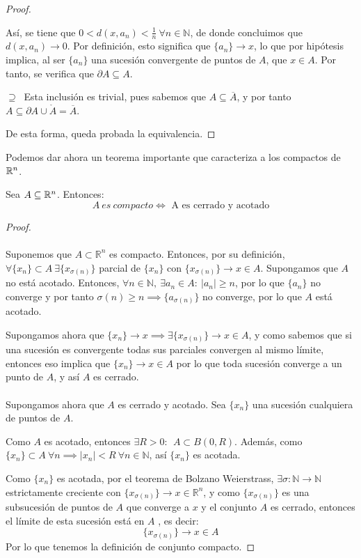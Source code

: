\begin{proof}
\begin{description}
Así, se tiene que $0 < d(x,a_n) < \frac{1}{n}\ \forall n\in \mathbb{N}$, de donde concluimos que $d(x,a_n) \rightarrow 0$. Por definición, esto significa que $\{a_n\} \rightarrow x$, lo que por hipótesis implica, al ser $\{a_n\}$ una sucesión convergente de puntos de $A$, que  $x\in A$. Por tanto, se verifica que $\partial A \subseteq A$.

\item $\displaystyle \boxed{\supseteq}\ $ Esta inclusión es trivial, pues sabemos que $A \subseteq \overline{A}$, y por tanto $A \subseteq \partial A \cup \mathring{A} = \overline{A}$.
\end{description}

De esta forma, queda probada la equivalencia.
\end{proof}

Podemos dar ahora un teorema importante que caracteriza a los compactos de $\mathbb{R}^n$.

\begin{nth}
Sea $A\subseteq \mathbb{R}^n$. Entonces:
\[
A \ es \ compacto \iff \text{ A es cerrado y acotado}
\]
\end{nth}
\begin{proof}\hfill\\
	\boxed{\Rightarrow}\\
	Suponemos que $A \subset \mathbb{R}^n$ es compacto. Entonces, por su definición, $\forall \{x_n\} \subset A \ \exists \{x_{\sigma(n)}\}$ parcial de $\{x_n\}$ con $\{x_{\sigma(n)}\} \to x \in A$. Supongamos que $A$ no está acotado. Entonces, $\forall n \in \mathbb{N}, \ \exists a_n \in A : \ |a_n| \geq n$, por lo que $\{a_n\}$ no converge y por tanto $\sigma(n) \geq n \implies \{a_{\sigma(n)}\}$ no converge, por lo que $A$ está acotado.

	Supongamos ahora que $\{x_n\} \to x \implies \exists \{x_{\sigma(n)}\} \to x \in A$, y como sabemos que si una sucesión es convergente todas sus parciales convergen al mismo límite, entonces eso implica que $\{x_n\}\to x \in A$ por lo que toda sucesión converge a un punto de $A$, y así $A$ es cerrado.
	\\
	\boxed{\Leftarrow}\\
	Supongamos ahora que $A$ es cerrado y acotado. Sea $\{x_n\}$ una sucesión cualquiera de puntos de $A$.

	Como $A$ es acotado, entonces $\exists R > 0 : \ \ A \subset B(0,R)$. Además, como $\{x_n\} \subset A \ \forall n \implies |x_n| < R \ \forall n \in \mathbb{N}$, así $\{x_n\}$ es acotada.

	Como $\{x_n\}$ es acotada, por el teorema de Bolzano Weierstrass, $\exists \sigma: \mathbb{N} \to \mathbb{N}$ estrictamente creciente con $\{x_{\sigma(n)}\}\to x \in \mathbb{R}^n$, y como $\{x_{\sigma(n)}\}$ es una subsucesión de puntos de $A$ que converge a $x$ y el conjunto $A$ es cerrado, entonces el límite de esta sucesión está en $A$ , es decir:
	\[
	\{x_{\sigma(n)}\}\to x \in A
	\]
Por lo que tenemos la definición de conjunto compacto.
\end{proof}

